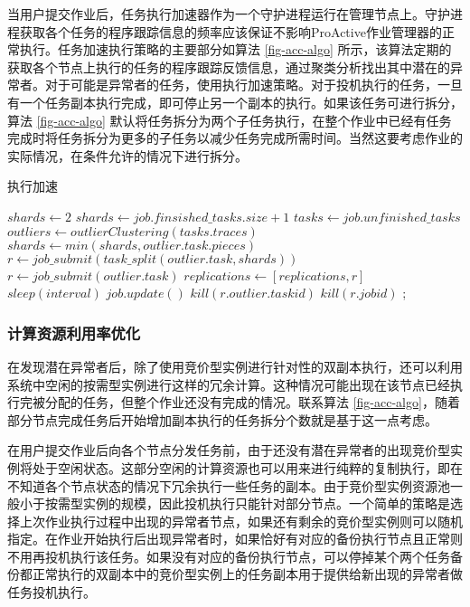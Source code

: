 当用户提交作业后，任务执行加速器作为一个守护进程运行在管理节点上。守护进程获取各个任务的程序跟踪信息的频率应该保证不影响ProActive作业管理器的正常执行。任务加速执行策略的主要部分如算法 \ref{fig-acc-algo} 所示，该算法定期的获取各个节点上执行的任务的程序跟踪反馈信息，通过聚类分析找出其中潜在的异常者。对于可能是异常者的任务，使用执行加速策略。对于投机执行的任务，一旦有一个任务副本执行完成，即可停止另一个副本的执行。如果该任务可进行拆分，算法 \ref{fig-acc-algo} 默认将任务拆分为两个子任务执行，在整个作业中已经有任务完成时将任务拆分为更多的子任务以减少任务完成所需时间。当然这要考虑作业的实际情况，在条件允许的情况下进行拆分。
\begin{algorithm}
\caption{执行加速}
\label{fig-acc-algo}
$shards\gets 2$
{
  {
    $shards\gets job.finsished\_tasks.size + 1$\;
  }
  $tasks\gets job.unfinished\_tasks$\;
  $outliers\gets outlierClustering(tasks.traces)$\;
  {
    {
      {
        $shards\gets min(shards, outlier.task.pieces)$\;
        $r\gets job\_submit(task\_split(outlier.task, shards))$\;
      }{
        $r\gets job\_submit(outlier.task)$\;
      }
      $replications\gets [replications, r]$\;
    }
  }
  $sleep(interval)$\;
  $job.update()$\;
  {
    {
      $kill(r.outlier.taskid)$\;
    }
    {
      $kill(r.jobid)$\;
    }
  }
}
;
\end{algorithm}

\subsubsection{计算资源利用率优化}
在发现潜在异常者后，除了使用竞价型实例进行针对性的双副本执行，还可以利用系统中空闲的按需型实例进行这样的冗余计算。这种情况可能出现在该节点已经执行完被分配的任务，但整个作业还没有完成的情况。联系算法 \ref{fig-acc-algo}，随着部分节点完成任务后开始增加副本执行的任务拆分个数就是基于这一点考虑。

在用户提交作业后向各个节点分发任务前，由于还没有潜在异常者的出现竞价型实例将处于空闲状态。这部分空闲的计算资源也可以用来进行纯粹的复制执行，即在不知道各个节点状态的情况下冗余执行一些任务的副本。由于竞价型实例资源池一般小于按需型实例的规模，因此投机执行只能针对部分节点。一个简单的策略是选择上次作业执行过程中出现的异常者节点，如果还有剩余的竞价型实例则可以随机指定。在作业开始执行后出现异常者时，如果恰好有对应的备份执行节点且正常则不用再投机执行该任务。如果没有对应的备份执行节点，可以停掉某个两个任务备份都正常执行的双副本中的竞价型实例上的任务副本用于提供给新出现的异常者做任务投机执行。

